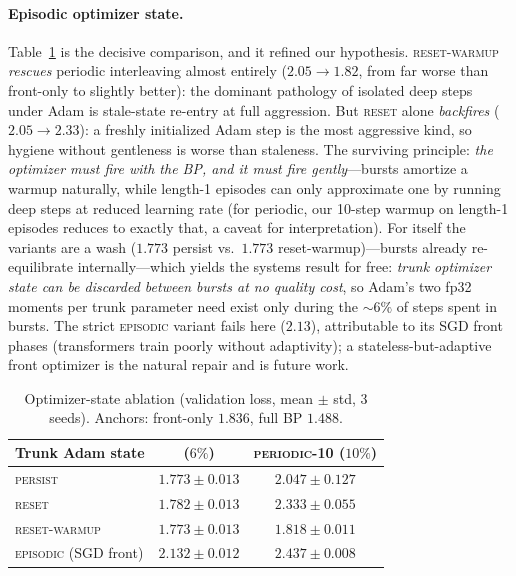 \paragraph{Episodic optimizer state.}
Table~\ref{tab:optstate} is the decisive comparison, and it refined our
hypothesis. \textsc{reset-warmup} \emph{rescues} periodic interleaving
almost entirely ($2.05 \to 1.82$, from far worse than front-only to
slightly better): the dominant pathology of isolated deep steps under Adam
is stale-state re-entry at full aggression. But \textsc{reset} alone
\emph{backfires} ($2.05 \to 2.33$): a freshly initialized Adam step is the
most aggressive kind, so hygiene without gentleness is worse than
staleness. The surviving principle: \emph{the optimizer must fire with the
BP, and it must fire gently}---bursts amortize a warmup naturally, while
length-1 episodes can only approximate one by running deep steps at reduced
learning rate (for periodic, our 10-step warmup on length-1 episodes
reduces to exactly that, a caveat for interpretation). For \fw{} itself the
variants are a wash ($1.773$ persist vs.\ $1.773$ reset-warmup)---bursts
already re-equilibrate internally---which yields the systems result for
free: \emph{trunk optimizer state can be discarded between bursts at no
quality cost}, so Adam's two fp32 moments per trunk parameter need exist
only during the ${\sim}6\%$ of steps spent in bursts. The strict
\textsc{episodic} variant fails here ($2.13$), attributable to its SGD
front phases (transformers train poorly without adaptivity); a
stateless-but-adaptive front optimizer is the natural repair and is future
work.

\begin{table}[t]
\centering
\caption{Optimizer-state ablation (validation loss, mean $\pm$ std,
3 seeds). Anchors: front-only $1.836$, full BP $1.488$.}
\label{tab:optstate}
\begin{tabular}{lcc}
\toprule
Trunk Adam state & \fw{} ($6\%$) & \textsc{periodic}-10 ($10\%$) \\
\midrule
\textsc{persist} & $1.773 \pm 0.013$ & $2.047 \pm 0.127$ \\
\textsc{reset} & $1.782 \pm 0.013$ & $2.333 \pm 0.055$ \\
\textsc{reset-warmup} & $\mathbf{1.773 \pm 0.013}$ & $\mathbf{1.818 \pm 0.011}$ \\
\textsc{episodic} (SGD front) & $2.132 \pm 0.012$ & $2.437 \pm 0.008$ \\
\bottomrule
\end{tabular}
\end{table}


